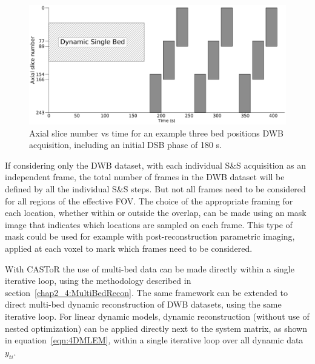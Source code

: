 \begin{figure} [h!]
\centering
\includegraphics[scale=0.28,angle=0]{3_Results/3_3_DWB_Reconstruction/figures/CompleteProtocolTiming.pdf}
\caption{Axial slice number vs time for an example three bed positions DWB acquisition, including an initial DSB phase of 180 s.}
\label{fig_3_3:CompleteProtocolFraming}
\end{figure} 

If considering only the DWB dataset, with each individual S\&S acquisition as an independent frame, the total number of frames in the DWB dataset will be defined by all the individual S\&S steps.%
But not all frames need to be considered for all regions of the effective FOV. 
The choice of the appropriate framing for each location, whether within or outside the overlap, can be made using an mask image that indicates which locations are sampled on each frame. This type of mask could be used for example with post-reconstruction parametric imaging, applied at each voxel to mark which frames need to be considered.

With CASToR the use of multi-bed data can be made directly within a single iterative loop, using the methodology described in section~\ref{chap2_4:MultiBedRecon}. The same framework can be extended to direct multi-bed dynamic reconstruction of DWB datasets, using the same iterative loop. 
For linear dynamic models, dynamic reconstruction (without use of nested optimization) can be applied directly next to the system matrix, as shown in equation~\ref{eqn:4DMLEM}, within a single iterative loop over all dynamic data $y_{ti}$. 


